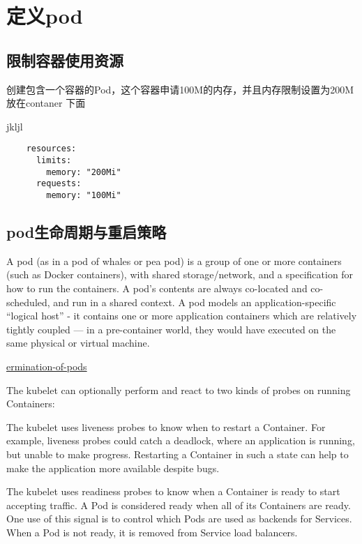 \section{定义pod}

\subsection{限制容器使用资源}

创建包含一个容器的Pod，这个容器申请100M的内存，并且内存限制设置为200M
放在contaner 下面

jkljl \cite{Survey2014}
\printbibliography

\begin{lstlisting}
    resources:
      limits:
        memory: "200Mi"
      requests:
        memory: "100Mi"
\end{lstlisting}


\subsection{pod生命周期与重启策略}

A pod (as in a pod of whales or pea pod) is a group of one or more containers (such as Docker containers), with shared storage/network, and a specification for how to run the containers. A pod’s contents are always co-located and co-scheduled, and run in a shared context. A pod models an application-specific “logical host” - it contains one or more application containers which are relatively tightly coupled — in a pre-container world, they would have executed on the same physical or virtual machine.

\href{https://kubernetes.io/docs/concepts/workloads/pods/pod/#termination-of-pods}{ermination-of-pods}

The kubelet can optionally perform and react to two kinds of probes on running Containers:

The kubelet uses liveness probes to know when to restart a Container. For example, liveness probes could catch a deadlock, where an application is running, but unable to make progress. Restarting a Container in such a state can help to make the application more available despite bugs.

The kubelet uses readiness probes to know when a Container is ready to start accepting traffic. A Pod is considered ready when all of its Containers are ready. One use of this signal is to control which Pods are used as backends for Services. When a Pod is not ready, it is removed from Service load balancers.

